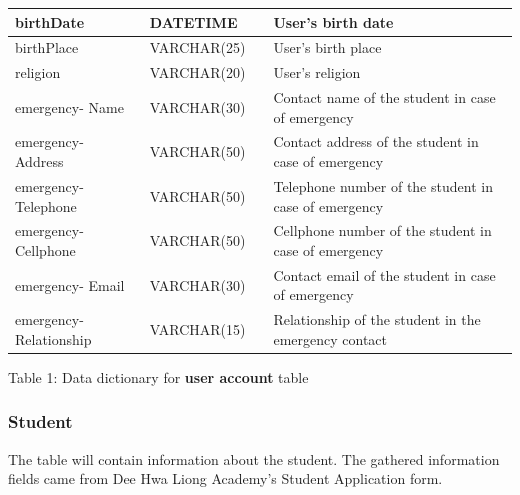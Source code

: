 \documentclass[11pt,a4paper,titlepage]{article}
\begin{document}
\begin{longtable}{ |p{2.5cm}|p{4.5cm}|p{2.5cm}|p{3cm}|  }
    birthDate & DATETIME & & User's birth date \\ \hline
    birthPlace & VARCHAR(25) & & User's birth place \\ \hline
    religion & VARCHAR(20) & & User's religion \\ \hline
    emergency- Name & VARCHAR(30) & & Contact name of the student in case of emergency \\ \hline
    emergency- Address & VARCHAR(50) & & Contact address of the student in case of emergency \\ \hline
    emergency- Telephone & VARCHAR(50) & & Telephone number of the student in case of emergency \\ \hline
    emergency- Cellphone & VARCHAR(50) & & Cellphone number of the student in case of emergency \\ \hline
    emergency- Email & VARCHAR(30) & & Contact email of the student in case of emergency \\ \hline
    emergency- Relationship & VARCHAR(15) & & Relationship of the student in the emergency contact \\ \hline
\end{longtable}

\vspace{1cm}
\begin{center}
Table 1: Data dictionary for \textbf{user account} table
\end{center}
\newpage
\subsubsection{Student}

The table will contain information about the student. The gathered information fields came from Dee Hwa Liong Academy's Student Application form.
\end{document}
